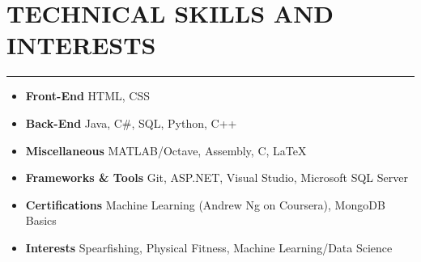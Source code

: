 \documentclass[11pt]{article} %
\begin{document}
		\vspace{.1cm}
	
	\section*{TECHNICAL SKILLS AND INTERESTS}
		\hrule \relax
		\vspace{.4cm}
		
		\begin{itemize}[noitemsep,nolistsep, label={}]
			\item \textbf{Front-End}                   \tabto*{5cm} HTML, CSS
			\item \textbf{Back-End}                    \tabto*{5cm} Java, C\#,  SQL, Python, C++
			\item \textbf{Miscellaneous}             \tabto*{5cm} MATLAB/Octave, Assembly, C, \LaTeX
			\item \textbf{Frameworks \& Tools}  \tabto*{5cm} Git, ASP.NET, Visual Studio, Microsoft SQL Server
			\item \textbf{Certifications}			   \tabto*{5cm} Machine Learning (Andrew Ng on Coursera), MongoDB Basics
			\item \textbf{Interests}                     \tabto*{5cm} Spearfishing, Physical Fitness, Machine Learning/Data Science
		\end{itemize}
		
		\vspace{.1cm}
	
\end{document}
